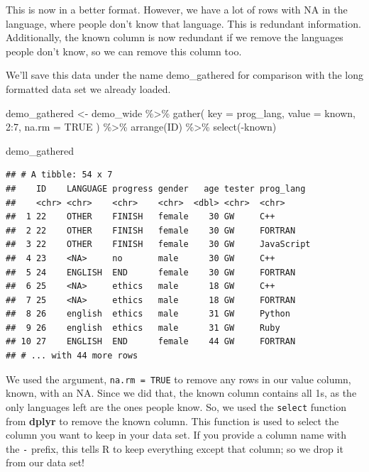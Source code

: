 \documentclass[
]{book}
\newenvironment{Shaded}{\begin{snugshade}}{\end{snugshade}}
\newcommand{\AttributeTok}[1]{\textcolor[rgb]{0.77,0.63,0.00}{#1}}
\newcommand{\ConstantTok}[1]{\textcolor[rgb]{0.00,0.00,0.00}{#1}}
\newcommand{\DecValTok}[1]{\textcolor[rgb]{0.00,0.00,0.81}{#1}}
\newcommand{\FunctionTok}[1]{\textcolor[rgb]{0.00,0.00,0.00}{#1}}
\newcommand{\NormalTok}[1]{#1}
\newcommand{\OtherTok}[1]{\textcolor[rgb]{0.56,0.35,0.01}{#1}}
\newcommand{\SpecialCharTok}[1]{\textcolor[rgb]{0.00,0.00,0.00}{#1}}
\begin{document}
This is now in a better format. However, we have a lot of rows with NA in the language, where people don't know that language. This is redundant information. Additionally, the known column is now redundant if we remove the languages people don't know, so we can remove this column too.

We'll save this data under the name demo\_gathered for comparison with the long formatted data set we already loaded.

\begin{Shaded}
\begin{Highlighting}[]
\NormalTok{demo\_gathered }\OtherTok{\textless{}{-}}\NormalTok{ demo\_wide }\SpecialCharTok{\%\textgreater{}\%} 
  \FunctionTok{gather}\NormalTok{(}
    \AttributeTok{key =}\NormalTok{ prog\_lang,}
    \AttributeTok{value =}\NormalTok{ known,}
    \DecValTok{2}\SpecialCharTok{:}\DecValTok{7}\NormalTok{,}
    \AttributeTok{na.rm =} \ConstantTok{TRUE}
\NormalTok{    ) }\SpecialCharTok{\%\textgreater{}\%}
  \FunctionTok{arrange}\NormalTok{(ID) }\SpecialCharTok{\%\textgreater{}\%}
  \FunctionTok{select}\NormalTok{(}\SpecialCharTok{{-}}\NormalTok{known)}
\end{Highlighting}
\end{Shaded}

\begin{Shaded}
\begin{Highlighting}[]
\NormalTok{demo\_gathered}
\end{Highlighting}
\end{Shaded}

\begin{verbatim}
## # A tibble: 54 x 7
##    ID    LANGUAGE progress gender   age tester prog_lang 
##    <chr> <chr>    <chr>    <chr>  <dbl> <chr>  <chr>     
##  1 22    OTHER    FINISH   female    30 GW     C++       
##  2 22    OTHER    FINISH   female    30 GW     FORTRAN   
##  3 22    OTHER    FINISH   female    30 GW     JavaScript
##  4 23    <NA>     no       male      30 GW     C++       
##  5 24    ENGLISH  END      female    30 GW     FORTRAN   
##  6 25    <NA>     ethics   male      18 GW     C++       
##  7 25    <NA>     ethics   male      18 GW     FORTRAN   
##  8 26    english  ethics   male      31 GW     Python    
##  9 26    english  ethics   male      31 GW     Ruby      
## 10 27    ENGLISH  END      female    44 GW     FORTRAN   
## # ... with 44 more rows
\end{verbatim}

We used the argument, \texttt{na.rm\ =\ TRUE} to remove any rows in our value column, known, with an NA. Since we did that, the known column contains all 1s, as the only languages left are the ones people know. So, we used the \texttt{select} function from \textbf{dplyr} to remove the known column. This function is used to select the column you want to keep in your data set. If you provide a column name with the \texttt{-} prefix, this tells R to keep everything except that column; so we drop it from our data set!
\end{document}
